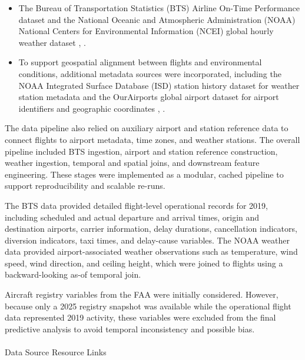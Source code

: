 \documentclass[
  letterpaper,
  DIV=11,
  numbers=noendperiod]{scrartcl}
\makeatletter
\let\oldparagraph\paragraph
\renewcommand{\paragraph}{
    \@ifstar
      \xxxParagraphStar
      \xxxParagraphNoStar
  }
\newcommand{\xxxParagraphStar}[1]{\oldparagraph*{#1}\mbox{}}
\newcommand{\xxxParagraphNoStar}[1]{\oldparagraph{#1}\mbox{}}
\makeatother
\begin{document}
\begin{itemize}
\item
  The Bureau of Transportation Statistics (BTS) Airline On-Time
  Performance dataset and the National Oceanic and Atmospheric
  Administration (NOAA) National Centers for Environmental Information
  (NCEI) global hourly weather dataset
  , .
\item
  To support geospatial alignment between flights and environmental
  conditions, additional metadata sources were incorporated, including
  the NOAA Integrated Surface Database (ISD) station history dataset for
  weather station metadata and the OurAirports global airport dataset
  for airport identifiers and geographic coordinates
  ,
  .
\end{itemize}

The data pipeline also relied on auxiliary airport and station reference
data to connect flights to airport metadata, time zones, and weather
stations. The overall pipeline included BTS ingestion, airport and
station reference construction, weather ingestion, temporal and spatial
joins, and downstream feature engineering. These stages were implemented
as a modular, cached pipeline to support reproducibility and scalable
re-runs.

The BTS data provided detailed flight-level operational records for
2019, including scheduled and actual departure and arrival times, origin
and destination airports, carrier information, delay durations,
cancellation indicators, diversion indicators, taxi times, and
delay-cause variables. The NOAA weather data provided airport-associated
weather observations such as temperature, wind speed, wind direction,
and ceiling height, which were joined to flights using a
backward-looking as-of temporal join.

Aircraft registry variables from the FAA were initially considered.
However, because only a 2025 registry snapshot was available while the
operational flight data represented 2019 activity, these variables were
excluded from the final predictive analysis to avoid temporal
inconsistency and possible bias.

\paragraph{Data Source Resource Links}\label{data-source-resource-links}
\end{document}
